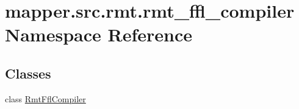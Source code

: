 \hypertarget{namespacemapper_1_1src_1_1rmt_1_1rmt__ffl__compiler}{}\section{mapper.\+src.\+rmt.\+rmt\+\_\+ffl\+\_\+compiler Namespace Reference}
\label{namespacemapper_1_1src_1_1rmt_1_1rmt__ffl__compiler}
\subsection*{Classes}
\begin{DoxyCompactItemize}
\item 
class \hyperlink{classmapper_1_1src_1_1rmt_1_1rmt__ffl__compiler_1_1_rmt_ffl_compiler}{Rmt\+Ffl\+Compiler}
\end{DoxyCompactItemize}
